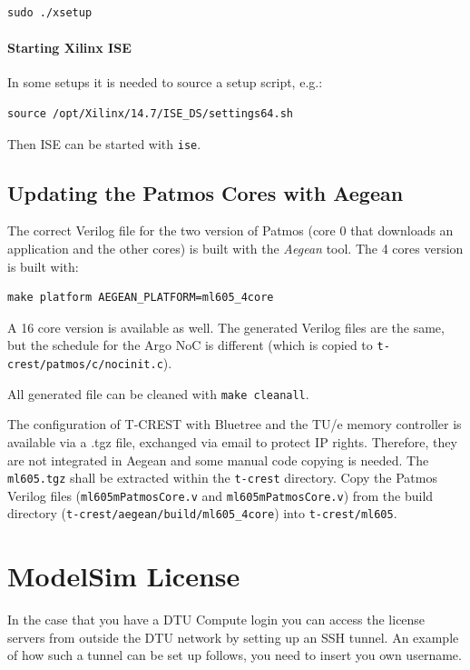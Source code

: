 \documentclass[a4paper,fontsize=10pt,twoside,DIV15,BCOR12mm,headinclude=true,footinclude=false,pagesize,bibtotoc]{scrbook}
\newcommand{\code}[1]{{\texttt{#1}}}
\begin{document}
\begin{verbatim}
sudo ./xsetup
\end{verbatim}

\paragraph{Starting Xilinx ISE}

In some setups it is needed to source a setup script, e.g.:

\begin{verbatim}
source /opt/Xilinx/14.7/ISE_DS/settings64.sh
\end{verbatim}

Then ISE can be started with \code{ise}.

\subsection{Updating the Patmos Cores with Aegean}

The correct Verilog file for the two version of Patmos (core 0 that downloads an application and the other cores)
is built with the \emph{Aegean} tool. The 4 cores version is built with:

\begin{verbatim}
make platform AEGEAN_PLATFORM=ml605_4core
\end{verbatim}


A 16 core version is available as well. The generated Verilog files are the same,
but the schedule for the Argo NoC is different (which is copied to
\code{t-crest/patmos/c/nocinit.c}).

All generated file can be cleaned with \code{make cleanall}.

The configuration of T-CREST with Bluetree and the TU/e memory controller
is available via a .tgz file, exchanged via email to protect IP rights.
Therefore, they are not integrated in Aegean and some manual code copying is needed.
The \code{ml605.tgz} shall be extracted within the \code{t-crest} directory.
Copy the Patmos Verilog files (\code{ml605mPatmosCore.v} and \code{ml605mPatmosCore.v})
from the build directory (\code{t-crest/aegean/build/ml605\_4core}) into \code{t-crest/ml605}.



\section{ModelSim License}
In the case that you have a DTU Compute login you can access the license servers from outside the DTU network by setting up an SSH tunnel.
An example of how such a tunnel can be set up follows, you need to insert you own username.
\end{document}
